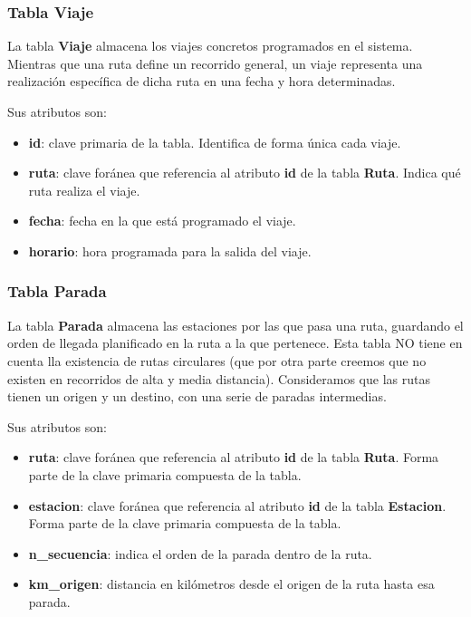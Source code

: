 \subsubsection{Tabla Viaje}\label{tabla-viaje}

La tabla \textbf{Viaje} almacena los viajes concretos programados en el
sistema. Mientras que una ruta define un recorrido general, un viaje
representa una realización específica de dicha ruta en una fecha y hora
determinadas.

Sus atributos son:

\begin{itemize}
\tightlist
\item
  \textbf{id}: clave primaria de la tabla. Identifica de forma única
  cada viaje.
\item
  \textbf{ruta}: clave foránea que referencia al atributo \textbf{id} de
  la tabla \textbf{Ruta}. Indica qué ruta realiza el viaje.
\item
  \textbf{fecha}: fecha en la que está programado el viaje.
\item
  \textbf{horario}: hora programada para la salida del viaje.
\end{itemize}

\subsubsection{Tabla Parada}\label{tabla-parada}

La tabla \textbf{Parada} almacena las estaciones por las que pasa una
ruta, guardando el orden de llegada planificado en la ruta a la que
pertenece. Esta tabla NO tiene en cuenta lla existencia de rutas
circulares (que por otra parte creemos que no existen en recorridos de
alta y media distancia). Consideramos que las rutas tienen un origen y
un destino, con una serie de paradas intermedias.

Sus atributos son:

\begin{itemize}
\tightlist
\item
  \textbf{ruta}: clave foránea que referencia al atributo \textbf{id} de
  la tabla \textbf{Ruta}. Forma parte de la clave primaria compuesta de
  la tabla.
\item
  \textbf{estacion}: clave foránea que referencia al atributo
  \textbf{id} de la tabla \textbf{Estacion}. Forma parte de la clave
  primaria compuesta de la tabla.
\item
  \textbf{n\_secuencia}: indica el orden de la parada dentro de la ruta.
\item
  \textbf{km\_origen}: distancia en kilómetros desde el origen de la
  ruta hasta esa parada.
\end{itemize}

